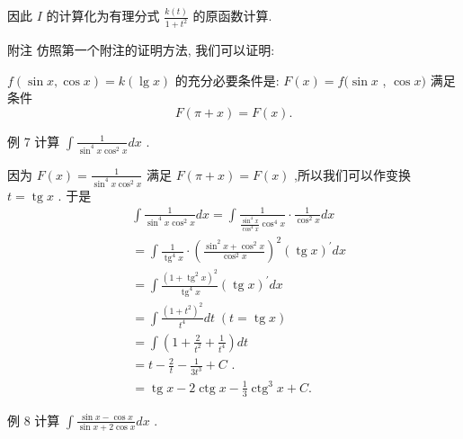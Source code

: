 因此 $I$ 的计算化为有理分式 $\frac{k\left( t\right) }{1 + {t}^{2}}$ 的原函数计算.

附注 仿照第一个附注的证明方法, 我们可以证明:

$f\left( {\sin x,\cos x}\right)  = k\left( {\lg x}\right)$ 的充分必要条件是: $F\left( x\right)  = f(\sin x$ , $\cos x)$ 满足条件
$$F\left( {\pi  + x}\right)  = F\left( x\right) .$$

例 7 计算 $\int \frac{1}{{\sin }^{4}x{\cos }^{2}x}{dx}$ .

因为 $F\left( x\right)  = \frac{1}{{\sin }^{4}x{\cos }^{2}x}$ 满足 $F\left( {\pi  + x}\right)  = F\left( x\right)$ ,所以我们可以作变换 $t = \operatorname{tg}x$ . 于是
\begin{align*}
	&\int \frac{1}{{\sin }^{4}x{\cos }^{2}x}{dx} = \int \frac{1}{\frac{{\sin }^{4}x}{{\cos }^{4}x}{\cos }^{4}x} \cdot  \frac{1}{{\cos }^{2}x}{dx}\\
	&= \int \frac{1}{{\operatorname{tg}}^{4}x} \cdot  {\left( \frac{{\sin }^{2}x + {\cos }^{2}x}{{\cos }^{2}x}\right) }^{2}{\left( \operatorname{tg}x\right) }^{\prime }{dx}\\
	&= \int \frac{{\left( 1 + {\operatorname{tg}}^{2}x\right) }^{2}}{{\operatorname{tg}}^{4}x}{\left( \operatorname{tg}x\right) }^{\prime }{dx}\\
	&= \int \frac{{\left( 1 + {t}^{2}\right) }^{2}}{{t}^{4}}{dt}\;\left( {t = \operatorname{tg}x}\right)\\
	&= \int \left( {1 + \frac{2}{{t}^{2}} + \frac{1}{{t}^{4}}}\right) {dt}\\
	&= t - \frac{2}{t} - \frac{1}{3{t}^{3}} + C\text{ . }\\
	&= \operatorname{tg}x - 2\operatorname{ctg}x - \frac{1}{3}{\operatorname{ctg}}^{3}x + C.
\end{align*}

例 8 计算 $\int \frac{\sin x - \cos x}{\sin x + 2\cos x}{dx}$ .

